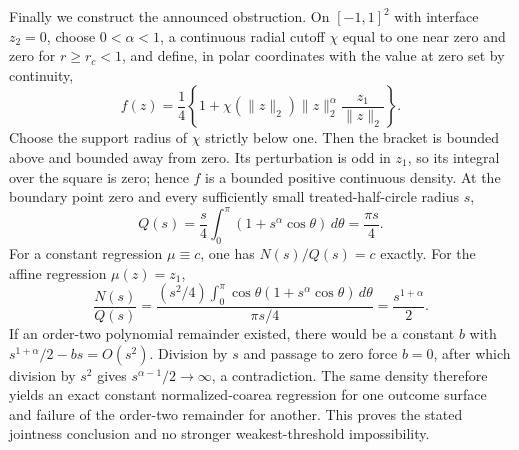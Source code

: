 Finally we construct the announced obstruction.  On \([-1,1]^2\) with interface \(z_2=0\), choose \(0<\alpha<1\), a continuous radial cutoff \(\chi\) equal to one near zero and zero for \(r\geq r_c<1\), and define, in polar coordinates with the value at zero set by continuity,
\[
 f(z)=\frac14\left\{1+\chi(\lVert z\rVert_2)
 \lVert z\rVert_2^\alpha\frac{z_1}{\lVert z\rVert_2}\right\}.
\]
Choose the support radius of \(\chi\) strictly below one.  Then the bracket is bounded above and bounded away from zero.  Its perturbation is odd in \(z_1\), so its integral over the square is zero; hence \(f\) is a bounded positive continuous density.  At the boundary point zero and every sufficiently small treated-half-circle radius \(s\),
\[
 Q(s)=\frac{s}{4}\int_0^\pi(1+s^\alpha\cos\theta)\,d\theta
 =\frac{\pi s}{4}.
\]
For a constant regression \(\mu\equiv c\), one has \(N(s)/Q(s)=c\) exactly.  For the affine regression \(\mu(z)=z_1\),
\[
 \frac{N(s)}{Q(s)}
 =\frac{(s^2/4)\int_0^\pi\cos\theta(1+s^\alpha\cos\theta)\,d\theta}
 {\pi s/4}
 =\frac{s^{1+\alpha}}2.
\]
If an order-two polynomial remainder existed, there would be a constant \(b\) with \(s^{1+\alpha}/2-bs=O(s^2)\).  Division by \(s\) and passage to zero force \(b=0\), after which division by \(s^2\) gives \(s^{\alpha-1}/2\to\infty\), a contradiction.  The same density therefore yields an exact constant normalized-coarea regression for one outcome surface and failure of the order-two remainder for another.  This proves the stated jointness conclusion and no stronger weakest-threshold impossibility.